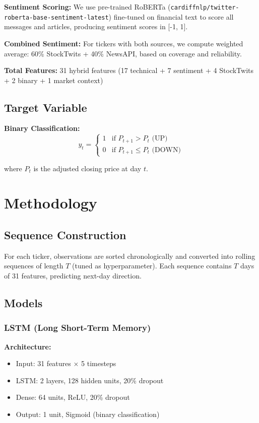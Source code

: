 \documentclass[10pt,twocolumn]{article}
\begin{document}
\textbf{Sentiment Scoring:} We use pre-trained RoBERTa (\texttt{cardiffnlp/twitter-roberta-base-sentiment-latest}) fine-tuned on financial text to score all messages and articles, producing sentiment scores in [-1, 1].

\textbf{Combined Sentiment:} For tickers with both sources, we compute weighted average: 60\% StockTwits + 40\% NewsAPI, based on coverage and reliability.

\textbf{Total Features:} 31 hybrid features (17 technical + 7 sentiment + 4 StockTwits + 2 binary + 1 market context)

\subsection{Target Variable}

\textbf{Binary Classification:}
\begin{equation}
y_t = \begin{cases}
1 & \text{if } P_{t+1} > P_t \text{ (UP)} \\
0 & \text{if } P_{t+1} \leq P_t \text{ (DOWN)}
\end{cases}
\end{equation}

where $P_t$ is the adjusted closing price at day $t$.

\section{Methodology}

\subsection{Sequence Construction}

For each ticker, observations are sorted chronologically and converted into rolling sequences of length $T$ (tuned as hyperparameter). Each sequence contains $T$ days of 31 features, predicting next-day direction.

\subsection{Models}

\subsubsection{LSTM (Long Short-Term Memory)}

\textbf{Architecture:}
\begin{itemize}
\item Input: 31 features × 5 timesteps
\item LSTM: 2 layers, 128 hidden units, 20\% dropout
\item Dense: 64 units, ReLU, 20\% dropout
\item Output: 1 unit, Sigmoid (binary classification)
\end{itemize}
\end{document}
